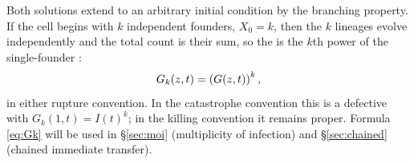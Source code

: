 Both solutions extend to an arbitrary initial condition by the branching
property. If the cell begins with $k$ independent founders, $X_0=k$, then the
$k$ lineages evolve independently and the total count is their sum, so the
\pgf{} is the $k$th power of the single-founder \pgf:
\begin{equation}
G_k(z,t) = \left( G(z,t)\right)^k,
\label{eq:Gk}
\end{equation}
in either rupture convention. In the catastrophe convention this is a
defective \pgf{} with $G_k(1,t)=I(t)^k$; in the killing convention it
remains proper. Formula \eqref{eq:Gk} will be used in \S\ref{sec:moi}
(multiplicity of infection) and \S\ref{sec:chained} (chained immediate
transfer).

